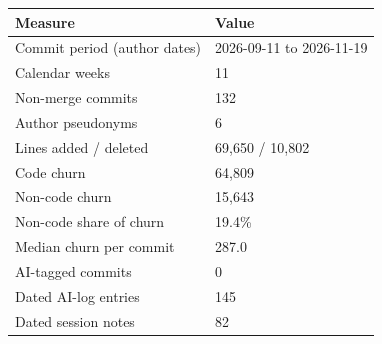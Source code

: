 \begin{tabular}{ll}
\hline
Measure & Value \\
\hline
Commit period (author dates) & 2026-09-11 to 2026-11-19 \\
Calendar weeks & 11 \\
Non-merge commits & 132 \\
Author pseudonyms & 6 \\
Lines added / deleted & 69,650 / 10,802 \\
Code churn & 64,809 \\
Non-code churn & 15,643 \\
Non-code share of churn & 19.4\% \\
Median churn per commit & 287.0 \\
AI-tagged commits & 0 \\
Dated AI-log entries & 145 \\
Dated session notes & 82 \\
\hline
\end{tabular}
